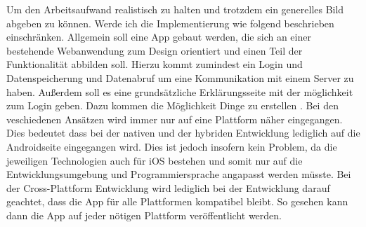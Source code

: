 Um den Arbeitsaufwand realistisch zu halten und trotzdem ein generelles Bild abgeben zu können. Werde ich die Implementierung wie folgend beschrieben einschränken.
Allgemein soll eine App gebaut werden, die sich an einer bestehende Webanwendung zum Design orientiert und einen Teil der Funktionalität abbilden soll.
Hierzu kommt zumindest ein Login und Datenspeicherung und Datenabruf um eine Kommunikation mit einem Server zu haben. Außerdem soll es eine grundsätzliche Erklärungsseite mit der möglichkeit zum Login geben. Dazu kommen die Möglichkeit Dinge zu erstellen
.
Bei den veschiedenen Ansätzen wird immer nur auf eine Plattform näher eingegangen. Dies bedeutet dass bei der nativen und der hybriden Entwicklung lediglich auf die Androidseite eingegangen wird. Dies ist jedoch insofern kein Problem, da die jeweiligen Technologien auch für iOS bestehen und somit nur auf die Entwicklungsumgebung und Programmiersprache angapasst werden müsste. Bei der Cross-Plattform Entwicklung wird lediglich bei der Entwicklung darauf geachtet, dass die App für alle Plattformen kompatibel bleibt. So gesehen kann dann die App auf jeder nötigen Plattform veröffentlicht werden.